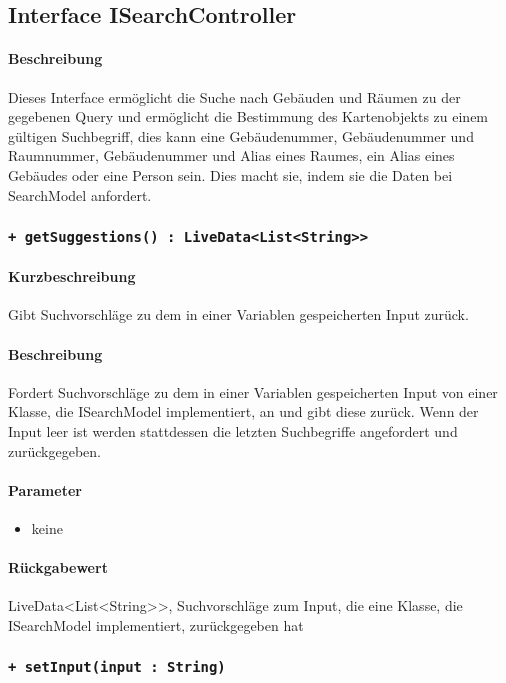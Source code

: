 \subsection{Interface ISearchController}
\paragraph*{Beschreibung}
Dieses Interface ermöglicht die Suche nach Gebäuden und Räumen zu der gegebenen Query 
und ermöglicht die Bestimmung des Kartenobjekts zu einem gültigen Suchbegriff, 
dies kann eine Gebäudenummer, Gebäudenummer und Raumnummer, Gebäudenummer und Alias eines Raumes, ein Alias eines Gebäudes oder eine Person sein.
Dies macht sie, indem sie die Daten bei SearchModel anfordert.


\subsubsection{\texttt{+ getSuggestions() : LiveData<List<String>>}}%
\paragraph*{Kurzbeschreibung}
Gibt Suchvorschläge zu dem in einer Variablen gespeicherten Input zurück.
\paragraph*{Beschreibung}
Fordert Suchvorschläge zu dem in einer Variablen gespeicherten Input von einer Klasse, die ISearchModel implementiert, an und gibt diese zurück.
Wenn der Input leer ist werden stattdessen die letzten Suchbegriffe angefordert und zurückgegeben.
\paragraph*{Parameter}
\begin{itemize}
    \item keine
\end{itemize}
\paragraph*{Rückgabewert}
LiveData<List<String>>, Suchvorschläge zum Input, die eine Klasse, die ISearchModel implementiert, zurückgegeben hat

\subsubsection{\texttt{+ setInput(input : String)}}%
